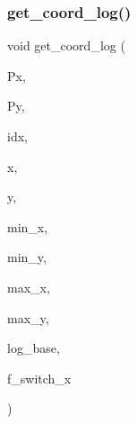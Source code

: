 \subsubsection{\texorpdfstring{get\+\_\+coord\+\_\+log()}{get\_coord\_log()}}
{\footnotesize\ttfamily void get\+\_\+coord\+\_\+log (\begin{DoxyParamCaption}\item[{\mbox{\hyperlink{galois_8h_a09fddde158a3a20bd2dcadb609de11dc}{I\+NT}} $\ast$}]{Px,  }\item[{\mbox{\hyperlink{galois_8h_a09fddde158a3a20bd2dcadb609de11dc}{I\+NT}} $\ast$}]{Py,  }\item[{\mbox{\hyperlink{galois_8h_a09fddde158a3a20bd2dcadb609de11dc}{I\+NT}}}]{idx,  }\item[{\mbox{\hyperlink{galois_8h_a09fddde158a3a20bd2dcadb609de11dc}{I\+NT}}}]{x,  }\item[{\mbox{\hyperlink{galois_8h_a09fddde158a3a20bd2dcadb609de11dc}{I\+NT}}}]{y,  }\item[{\mbox{\hyperlink{galois_8h_a09fddde158a3a20bd2dcadb609de11dc}{I\+NT}}}]{min\+\_\+x,  }\item[{\mbox{\hyperlink{galois_8h_a09fddde158a3a20bd2dcadb609de11dc}{I\+NT}}}]{min\+\_\+y,  }\item[{\mbox{\hyperlink{galois_8h_a09fddde158a3a20bd2dcadb609de11dc}{I\+NT}}}]{max\+\_\+x,  }\item[{\mbox{\hyperlink{galois_8h_a09fddde158a3a20bd2dcadb609de11dc}{I\+NT}}}]{max\+\_\+y,  }\item[{double}]{log\+\_\+base,  }\item[{\mbox{\hyperlink{galois_8h_a09fddde158a3a20bd2dcadb609de11dc}{I\+NT}}}]{f\+\_\+switch\+\_\+x }\end{DoxyParamCaption})}

\mbox{\label{plot_8_c_a40dac96f82a9acafbf7d017f601b9880}} 

